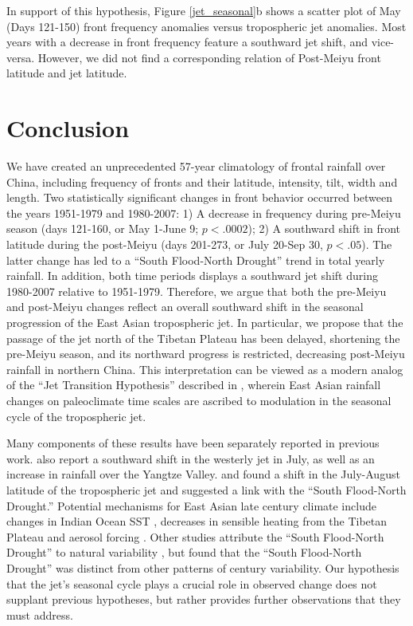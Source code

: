 \documentclass[draft,grl]{AGUTeX}
\begin{document}
\begin{article}
	In support of this hypothesis, Figure \ref{jet_seasonal}b shows a scatter plot of May (Days 121-150) front frequency anomalies versus tropospheric jet anomalies. Most years with a decrease in front frequency feature a southward jet shift, and vice-versa. However, we did not find a corresponding relation of Post-Meiyu front latitude and jet latitude.
	
	
\section{Conclusion}

	We have created an unprecedented 57-year climatology of frontal rainfall over China, including frequency of fronts and their latitude, intensity, tilt, width and length. Two statistically significant changes in front behavior occurred between the years 1951-1979 and 1980-2007: 1) A decrease in frequency during pre-Meiyu season (days 121-160, or May 1-June 9; $p < .0002$); 2) A southward shift in front latitude during the post-Meiyu (days 201-273, or July 20-Sep 30, $p<.05$). The latter change has led to a ``South Flood-North Drought'' trend in total yearly rainfall. In addition, both time periods displays a southward jet shift during 1980-2007 relative to 1951-1979. Therefore, we argue that both the pre-Meiyu and post-Meiyu changes reflect an overall southward shift in the seasonal progression of the East Asian tropospheric jet. In particular, we propose that the passage of the jet north of the Tibetan Plateau has been delayed, shortening the pre-Meiyu season, and its northward progress is restricted, decreasing post-Meiyu rainfall in northern China. This interpretation can be viewed as a modern analog of the ``Jet Transition Hypothesis'' described in \citet{Chiang2015}, wherein East Asian rainfall changes on paleoclimate time scales are ascribed to modulation in the seasonal cycle of the tropospheric jet. 
	
	Many components of these results have been separately reported in previous work. \citet{Xuan2011} also report a southward shift in the westerly jet in July, as well as an increase in rainfall over the Yangtze Valley. \citet{Yu2004} and \citet{Yu2007} found a shift in the July-August latitude of the tropospheric jet and suggested a link with the ``South Flood-North Drought.'' Potential mechanisms for East Asian late  century climate include changes in Indian Ocean SST \citep{Qu2012}, decreases in sensible heating from the Tibetan Plateau \citep{Liu2012a,Hu2015} and aerosol forcing \citep{Song2014}. Other studies attribute the ``South Flood-North Drought'' to natural variability \citep{Zhang1999,Xin2006,Lei2014}, but\citet{Zhou2009} found that the ``South Flood-North Drought'' was distinct from other patterns of  century variability. Our hypothesis that the jet's seasonal cycle plays a crucial role in observed change does not supplant previous hypotheses, but rather provides further observations that they must address.
	

\end{article}
\end{document}
